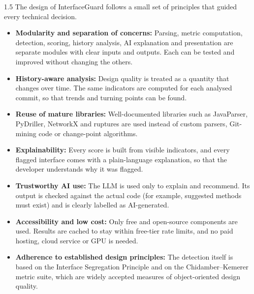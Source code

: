 \documentclass[12pt,a4paper]{article}
\begin{document}
\begin{spacing}{1.5}
\justifying
The design of InterfaceGuard follows a small set of principles that guided
every technical decision.

\begin{itemize}[leftmargin=*,itemsep=2pt]
  \item \textbf{Modularity and separation of concerns:} Parsing, metric
        computation, detection, scoring, history analysis, AI explanation
        and presentation are separate modules with clear inputs and outputs.
        Each can be tested and improved without changing the others.

  \item \textbf{History-aware analysis:} Design quality is treated as a
        quantity that changes over time. The same indicators are computed
        for each analysed commit, so that trends and turning points can
        be found.

  \item \textbf{Reuse of mature libraries:} Well-documented libraries such
        as JavaParser, PyDriller, NetworkX and ruptures are used instead
        of custom parsers, Git-mining code or change-point algorithms.

  \item \textbf{Explainability:} Every score is built from visible
        indicators, and every flagged interface comes with a plain-language
        explanation, so that the developer understands why it was flagged.

  \item \textbf{Trustworthy AI use:} The LLM is used only to explain and
        recommend. Its output is checked against the actual code (for
        example, suggested methods must exist) and is clearly labelled
        as AI-generated.

  \item \textbf{Accessibility and low cost:} Only free and open-source
        components are used. Results are cached to stay within free-tier
        rate limits, and no paid hosting, cloud service or GPU is needed.

  \item \textbf{Adherence to established design principles:} The detection
        itself is based on the Interface Segregation Principle and on the
        Chidamber--Kemerer metric suite, which are widely accepted measures
        of object-oriented design quality.
\end{itemize}
\end{spacing}
\end{document}
